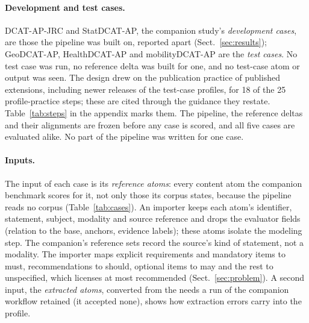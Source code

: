 \paragraph{Development and test cases.} DCAT-AP-JRC and StatDCAT-AP, the companion study's \emph{development
cases}, are those the pipeline was built on, reported apart (Sect.~\ref{sec:results}); GeoDCAT-AP, HealthDCAT-AP
and mobilityDCAT-AP are the \emph{test cases}. No test case was run, no reference delta
was built for one, and no test-case atom or output was seen. The design drew on the publication practice of
published extensions, including newer releases of the test-case profiles, for 18 of the 25 profile-practice steps;
these are cited through the guidance they restate. Table~\ref{tab:steps} in the appendix marks them. %
 The pipeline, the reference deltas and their alignments are frozen
before any case is scored, and all five cases are evaluated alike. %
 No part of the pipeline was written for one case.

\paragraph{Inputs.} The input of each case is its \emph{reference atoms}: every content atom the companion
benchmark scores for it, not only those its corpus states, because the pipeline reads no corpus
(Table~\ref{tab:cases}).  An importer keeps each atom's identifier,
statement, subject, modality and source reference and drops the evaluator fields (relation to the base, anchors,
evidence labels); these atoms isolate the modeling step.
The companion's reference sets record the source's kind of statement, not a modality. The importer maps explicit
requirements and mandatory items to must, recommendations to should, optional items to may and the rest to
unspecified, which licenses at most recommended (Sect.~\ref{sec:problem}).
  A second
input, the \emph{extracted atoms}, converted from the needs a run of the companion workflow retained (it accepted
none), shows how extraction errors carry into the profile. %

